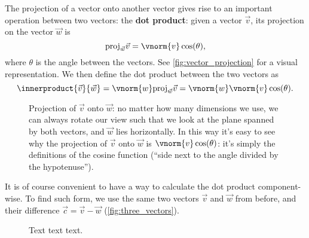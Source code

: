 The projection of a vector onto another vector gives rise to an important operation between two vectors: the \textbf{dot product}: given a vector $\vec{v}$, its projection on the vector $\vec{w}$ is
\begin{equation}
	\text{proj}_{\vec{w}}\vec{v} = \vnorm{v}\cos(\theta),
	\label{eq:vector_projection}
\end{equation}
where $\theta$ is the angle between the vectors. See \autoref{fig:vector_projection} for a visual representation. We then define the dot product between the two vectors as
\begin{equation}
	\innerproduct{\vec{v}}{\vec{w}} = \vnorm{w}\text{proj}_{\vec{w}}\vec{v} = \vnorm{w}\vnorm{v}\cos(\theta).
	\label{eq:label}
\end{equation}

\begin{figure}
	\begin{center}
	\end{center}
	\caption{Projection of $\vec{v}$ onto $\vec{w}$: no matter how many dimensions we use, we can always rotate our view such that we look at the plane spanned by both vectors, and $\vec{w}$ lies horizontally. In this way it's easy to see why the projection of $\vec{v}$ onto $\vec{w}$ is $\vnorm{v}\cos(\theta)$: it's simply the definitions of the cosine function (\enquote{side next to the angle divided by the hypotenuse}).}
	\label{fig:vector_projection}
\end{figure}

It is of course convenient to have a way to calculate the dot product component-wise. To find such form, we use the same two vectors $\vec{v}$ and $\vec{w}$ from before, and their difference $\vec{c}=\vec{v}-\vec{w}$ (\autoref{fig:three_vectors}).

\begin{figure}
	\begin{center}
	\end{center}
	\caption{Text text text.}
	\label{fig:three_vectors}
\end{figure}

